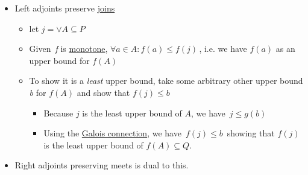 \begin{itemize}

    \item Left adjoints preserve \href{doc/1 math/Seven Sketches in Compositionality/Chapter 1: Generative Effects/5 Meets and joins/1 Definition and basic examples/Meet and join}{joins}
          \begin{itemize}
            \item let $j = \vee A \subseteq P$
            \item Given \,\emph{f} is \href{doc/1 math/Seven Sketches in Compositionality/Chapter 1: Generative Effects/4 Monotone maps/1 Monotone map}{monotone}, $\forall a \in A: f(a) \leq f(j)$\,, i.e. we have $f(a)$ as an upper bound for $f(A)$
            \item To show it is a \emph{least} upper bound, take some arbitrary other upper bound \emph{b} for $f(A)$ and show that $f(j) \leq b$
                  \begin{itemize}
                    \item Because $j$ is the least upper bound of $A$, we have \,$j \leq g(b)$\,
                    \item Using the \href{doc/1 math/Seven Sketches in Compositionality/Chapter 1: Generative Effects/6 Galois connections/1 Definition and examples/Galois connection}{Galois connection}, we have \,$f(j) \leq b$\, showing that $f(j)$ is the least upper bound of $f(A) \subseteq Q$.
                  \end{itemize}
          \end{itemize}
      \item Right adjoints preserving meets is dual to this.
  \end{itemize}